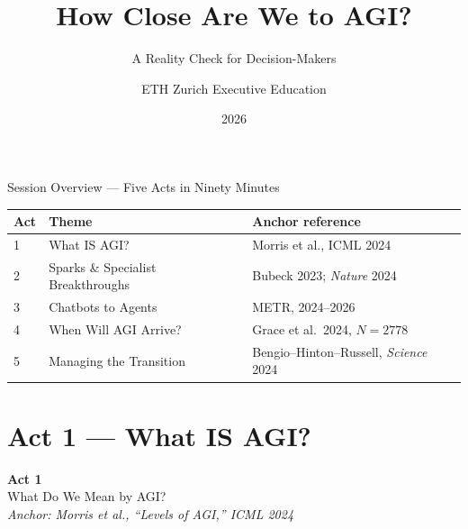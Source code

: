 \documentclass[aspectratio=169, 12pt, xcolor={dvipsnames,table}]{beamer}
\title{How Close Are We to AGI?}
\subtitle{A Reality Check for Decision-Makers}
\author{ETH Zurich Executive Education}
\date{2026}
\institute{}
\begin{document}
\begin{frame}[plain]
  \vspace*{-2em}
  \titlepage
\end{frame}

\begin{frame}{Session Overview --- Five Acts in Ninety Minutes}
\vspace{0.3em}
\renewcommand{\arraystretch}{1.35}
\begin{center}
\begin{tabular}{@{}p{1.2cm} p{7.5cm} p{4.8cm}@{}}
\toprule
\textbf{Act} & \textbf{Theme} & \textbf{Anchor reference}\\
\midrule
\rowcolor{NavyBlue!10}    1 & What IS AGI? & Morris et al., ICML 2024\\
\rowcolor{NavyBlue!15}    2 & Sparks \& Specialist Breakthroughs & Bubeck 2023; \emph{Nature} 2024\\
\rowcolor{BrickRed!10}    3 & Chatbots to Agents & METR, 2024--2026\\
\rowcolor{BrickRed!15}    4 & When Will AGI Arrive? & Grace et al.\ 2024, $N{=}2778$\\
\rowcolor{ForestGreen!15} 5 & Managing the Transition & Bengio--Hinton--Russell, \emph{Science} 2024\\
\bottomrule
\end{tabular}
\end{center}
\end{frame}

\section{Act 1 --- What IS AGI?}

\begin{frame}[plain]
\begin{center}
  {\Huge\bfseries Act 1}\\[0.4em]
  {\large What Do We Mean by AGI?}\\[1.5em]
  {\footnotesize\itshape Anchor: Morris et al., ``Levels of AGI,'' ICML 2024}
\end{center}
\end{frame}
\end{document}
